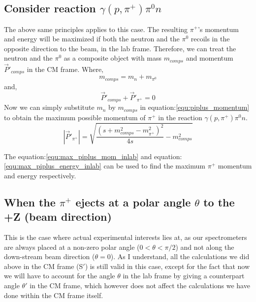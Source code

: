 \documentclass[11pt,letterpaper]{article}
\begin{document}
\subsection{Consider reaction $\gamma(p,\pi^{+})\pi^0n$}

The above same principles applies to this case. The resulting $\pi^+$'s momentum and energy will be maximized if both the neutron and the $\pi^0$ recoils in the opposite direction to the beam, in the lab frame. Therefore, we can treat the neutron and the $\pi^0$ as a composite object with mass $m_{comps}$ and momentum $\vec{P}'_{comps}$ in the CM frame. Where,
\begin{equation}
    m_{comps} = m_n + m_{\pi^0}
\end{equation}
and,
\begin{equation}
    \vec{P}'_{comps} + \vec{P}'_{\pi^+} = 0
\end{equation}
Now we can simply substitute $m_n$ by $m_{comps}$ in equation:\ref{equ:piplus_momentum} to obtain the maximum possible momentum of $\pi^+$ in the reaction $\gamma(p,\pi^{+})\pi^0n$.
\begin{equation}
    |\vec{P}'_{\pi^+}| = \sqrt{\frac{(s+m_{comps}^2-m_{\pi^+}^2)^2}{4s} - m_{comps}^2}  
  \label{equ:piplus_momentum_2pi}  
\end{equation}

 The equation:\ref{equ:max_piplus_mom_inlab} and equation:\ref{equ:max_piplus_energy_inlab} can be used to find the maximum $\pi^+$ momentum and energy respectively.



\subsection{When the $\pi^+$ ejects at a polar angle $\theta$ to the +Z (beam direction)}

This is the case where actual experimental interests lies at, as our spectrometers are always placed at a non-zero polar angle ($0<\theta<\pi/2$) and not along the down-stream beam direction ($\theta = 0$). As I understand, all the calculations we did above in the CM frame (S$'$) is still valid in this case, except for the fact that now we will have to account for the angle $\theta$ in the lab frame by giving a counterpart angle $\theta'$ in the CM frame, which however does not affect the calculations we have done within the CM frame itself.
\end{document}
